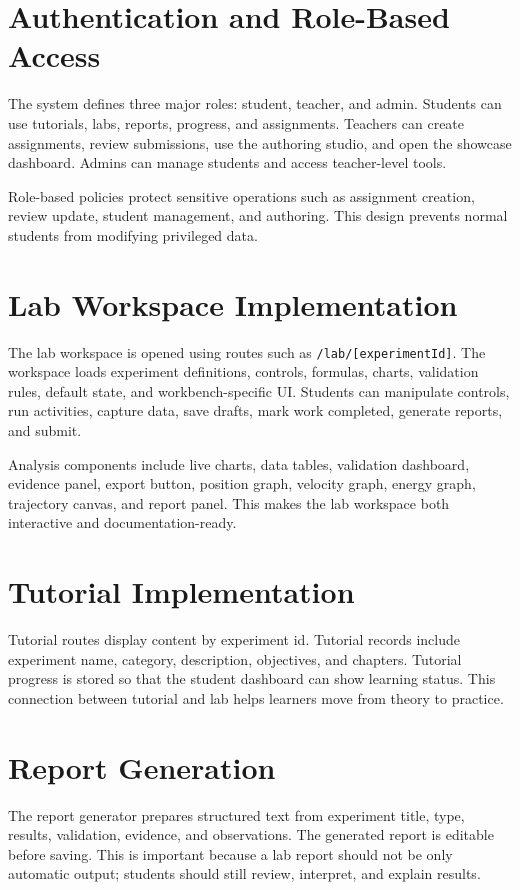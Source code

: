 \documentclass[12pt,a4paper]{report}
\begin{document}
\section{Authentication and Role-Based Access}
The system defines three major roles: student, teacher, and admin. Students can use tutorials, labs, reports, progress, and assignments. Teachers can create assignments, review submissions, use the authoring studio, and open the showcase dashboard. Admins can manage students and access teacher-level tools.

Role-based policies protect sensitive operations such as assignment creation, review update, student management, and authoring. This design prevents normal students from modifying privileged data.

\section{Lab Workspace Implementation}
The lab workspace is opened using routes such as \texttt{/lab/[experimentId]}. The workspace loads experiment definitions, controls, formulas, charts, validation rules, default state, and workbench-specific UI. Students can manipulate controls, run activities, capture data, save drafts, mark work completed, generate reports, and submit.

Analysis components include live charts, data tables, validation dashboard, evidence panel, export button, position graph, velocity graph, energy graph, trajectory canvas, and report panel. This makes the lab workspace both interactive and documentation-ready.

\section{Tutorial Implementation}
Tutorial routes display content by experiment id. Tutorial records include experiment name, category, description, objectives, and chapters. Tutorial progress is stored so that the student dashboard can show learning status. This connection between tutorial and lab helps learners move from theory to practice.

\section{Report Generation}
The report generator prepares structured text from experiment title, type, results, validation, evidence, and observations. The generated report is editable before saving. This is important because a lab report should not be only automatic output; students should still review, interpret, and explain results.
\end{document}
